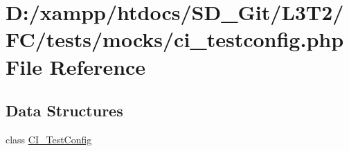 \hypertarget{tests_2mocks_2ci__testconfig_8php}{}\section{D\+:/xampp/htdocs/\+S\+D\+\_\+\+Git/\+L3\+T2/\+F\+C/tests/mocks/ci\+\_\+testconfig.php File Reference}
\label{tests_2mocks_2ci__testconfig_8php}
\subsection*{Data Structures}
\begin{DoxyCompactItemize}
\item 
class \hyperlink{class_c_i___test_config}{C\+I\+\_\+\+Test\+Config}
\end{DoxyCompactItemize}
